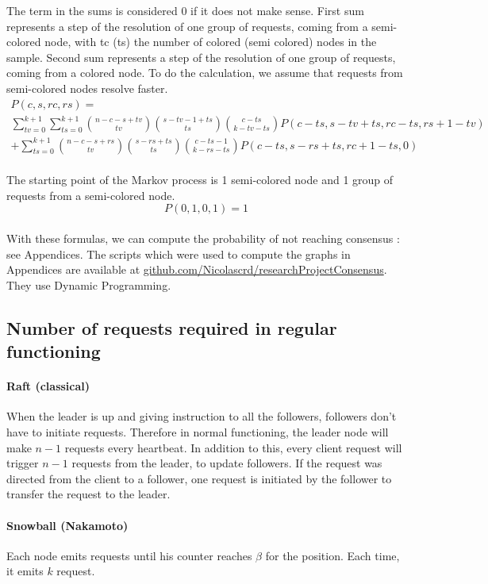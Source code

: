 \documentclass[11pt, twocolumn]{article}
\begin{document}
The term in the sums is considered 0 if it does not make sense.
First sum represents a step of the resolution of one group of requests, coming from a semi-colored node, with tc (ts) the number of colored (semi colored) nodes in the sample.
Second sum represents a step of the resolution of one group of requests, coming from a colored node.
To do the calculation, we assume that requests from semi-colored nodes resolve faster.
\begin{multline*}
    P(c, s, rc, rs) = \\ \sum_{tv=0}^{k+1}\sum_{ts=0}^{k+1} {n-c-s+tv \choose tv}{s-tv-1+ts \choose ts}{c-ts \choose k-tv-ts}P(c-ts, s-tv+ts, rc-ts, rs+1-tv)
    \\ + \sum_{ts=0}^{k+1} {n-c-s+rs \choose tv}{s-rs+ts \choose ts}{c-ts-1 \choose k-rs-ts}P(c-ts, s-rs+ts, rc+1-ts, 0)
\end{multline*}
\\
The starting point of the Markov process is 1 semi-colored node and 1 group of requests from a semi-colored node. 
\begin{equation*}
    P(0, 1, 0, 1) = 1
\end{equation*}
\\
With these formulas, we can compute the probability of not reaching consensus : see Appendices.
The scripts which were used to compute the graphs in Appendices are available at \href{https://github.com/Nicolascrd/researchProjectConsensus}{github.com/Nicolascrd/researchProjectConsensus}. They use Dynamic Programming.

\subsection{Number of requests required in regular functioning}

\paragraph{Raft (classical)}
When the leader is up and giving instruction to all the followers, followers don't have to initiate requests.
Therefore in normal functioning, the leader node will make $n-1$ requests every heartbeat.
In addition to this, every client request will trigger $n-1$ requests from the leader, to update followers. If the request was directed from the client to a follower, one request is initiated
by the follower to transfer the request to the leader.

\paragraph{Snowball (Nakamoto)}
Each node emits requests until his counter reaches $\beta$ for the position. Each time, it emits $k$ request. 
\end{document}
